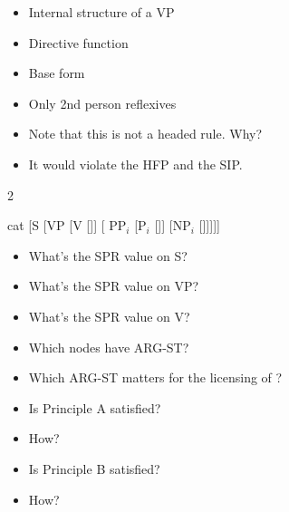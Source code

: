 \documentclass[a4paper,landscape,headrule,footrule]{foils}
\begin{document}



\begin{itemize}\addtolength{\itemsep}{-2ex}
\item Internal structure of a VP
\item Directive function
\item Base form
\item Only 2nd person reflexives
\item[Q] Note that this is not a headed rule. Why?
\item[A] It would violate the HFP and the SIP.
\end{itemize}

\begin{multicols}{2}
\begin{forest}
cat
[{S} [{VP } [{V \avm{[ spr & < \1 > ]}} [{}]]
[{\avm{\3} PP$_i$} [{P$_i$} [{\eng{for}}]]
[{NP$_i$ } [{}]]]]]
\end{forest}

\begin{itemize}
\item What's the SPR value on S?
\item What's the SPR value on VP?
\item What's the SPR value on V?
\item Which nodes have ARG-ST?
\item Which ARG-ST matters for
the licensing of ?
\end{itemize}

\end{multicols}

\begin{center}
\end{center}
\begin{itemize}
\item Is Principle A satisfied?
\item How?
\item Is Principle B satisfied?
\item How?
\end{itemize}
\end{document}
